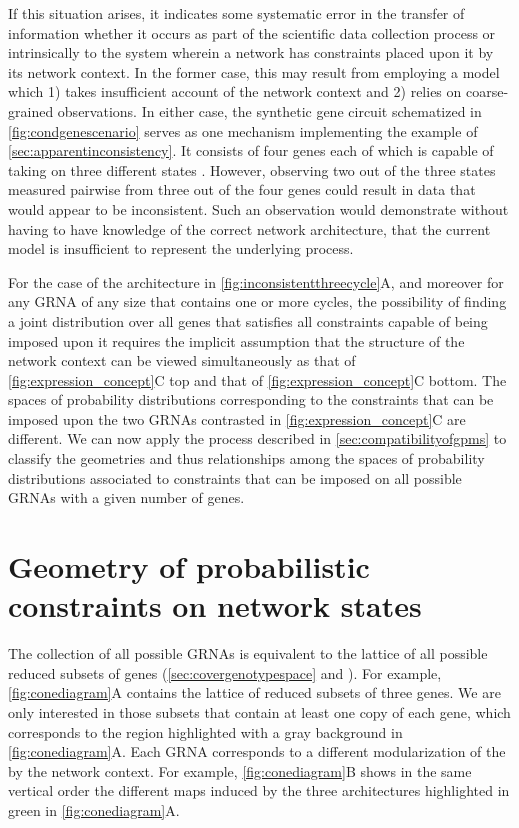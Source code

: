 If this situation arises, it indicates some systematic error in the transfer of information whether it occurs as part of the scientific data collection process or intrinsically to the system wherein a network has constraints placed upon it by its network context. In the former case, this may result from employing a model which 1) takes insufficient account of the network context and 2) relies on coarse-grained observations. In either case, the synthetic gene circuit schematized in \ref{fig:condgenescenario} serves as one mechanism implementing the example of \ref{sec:apparentinconsistency}. It consists of four genes each of which is capable of taking on three different states \cite{Rieckh2013a}. However, observing two out of the three states measured pairwise from three out of the four genes could result in data that would appear to be inconsistent. Such an observation would demonstrate without having to have knowledge of the correct network architecture, that the current model is insufficient to represent the underlying process.

For the case of the architecture in \ref{fig:inconsistentthreecycle}A, and moreover for any GRNA of any size that contains one or more cycles, the possibility of finding a joint distribution over all genes that satisfies all constraints capable of being imposed upon it requires the implicit assumption that the structure of the network context can be viewed simultaneously as that of \ref{fig:expression_concept}C top and that of \ref{fig:expression_concept}C bottom. The spaces of probability distributions corresponding to the constraints that can be imposed upon the two GRNAs contrasted in \ref{fig:expression_concept}C are different. We can now apply the process described in \ref{sec:compatibilityofgpms} to classify the geometries and thus relationships among the spaces of probability distributions associated to constraints that can be imposed on all possible GRNAs with a given number of genes.

\section{Geometry of probabilistic constraints on network states}\label{sec:probconstrgeometry}
The collection of all possible GRNAs is equivalent to the lattice of all possible reduced subsets of genes (\ref{sec:covergenotypespace} and ). For example, \ref{fig:conediagram}A contains the lattice of reduced subsets of three genes. We are only interested in those subsets that contain at least one copy of each gene, which corresponds to the region highlighted with a gray background in \ref{fig:conediagram}A. Each GRNA corresponds to a different modularization of the \gnpm{} by the network context. For example, \ref{fig:conediagram}B shows in the same vertical order the different maps induced by the three architectures highlighted in green in \ref{fig:conediagram}A.

